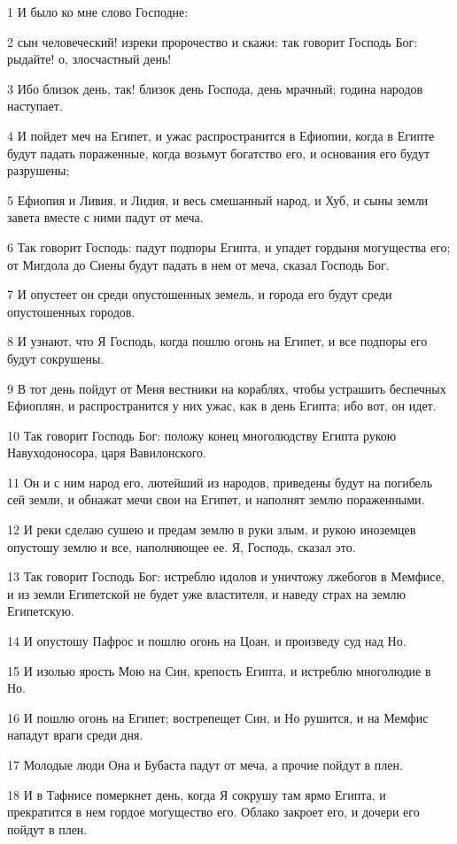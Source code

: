 \par 1 И было ко мне слово Господне:
\par 2 сын человеческий! изреки пророчество и скажи: так говорит Господь Бог: рыдайте! о, злосчастный день!
\par 3 Ибо близок день, так! близок день Господа, день мрачный; година народов наступает.
\par 4 И пойдет меч на Египет, и ужас распространится в Ефиопии, когда в Египте будут падать пораженные, когда возьмут богатство его, и основания его будут разрушены;
\par 5 Ефиопия и Ливия, и Лидия, и весь смешанный народ, и Хуб, и сыны земли завета вместе с ними падут от меча.
\par 6 Так говорит Господь: падут подпоры Египта, и упадет гордыня могущества его; от Мигдола до Сиены будут падать в нем от меча, сказал Господь Бог.
\par 7 И опустеет он среди опустошенных земель, и города его будут среди опустошенных городов.
\par 8 И узнают, что Я Господь, когда пошлю огонь на Египет, и все подпоры его будут сокрушены.
\par 9 В тот день пойдут от Меня вестники на кораблях, чтобы устрашить беспечных Ефиоплян, и распространится у них ужас, как в день Египта; ибо вот, он идет.
\par 10 Так говорит Господь Бог: положу конец многолюдству Египта рукою Навуходоносора, царя Вавилонского.
\par 11 Он и с ним народ его, лютейший из народов, приведены будут на погибель сей земли, и обнажат мечи свои на Египет, и наполнят землю пораженными.
\par 12 И реки сделаю сушею и предам землю в руки злым, и рукою иноземцев опустошу землю и все, наполняющее ее. Я, Господь, сказал это.
\par 13 Так говорит Господь Бог: истреблю идолов и уничтожу лжебогов в Мемфисе, и из земли Египетской не будет уже властителя, и наведу страх на землю Египетскую.
\par 14 И опустошу Пафрос и пошлю огонь на Цоан, и произведу суд над Но.
\par 15 И изолью ярость Мою на Син, крепость Египта, и истреблю многолюдие в Но.
\par 16 И пошлю огонь на Египет; вострепещет Син, и Но рушится, и на Мемфис нападут враги среди дня.
\par 17 Молодые люди Она и Бубаста падут от меча, а прочие пойдут в плен.
\par 18 И в Тафнисе померкнет день, когда Я сокрушу там ярмо Египта, и прекратится в нем гордое могущество его. Облако закроет его, и дочери его пойдут в плен.
